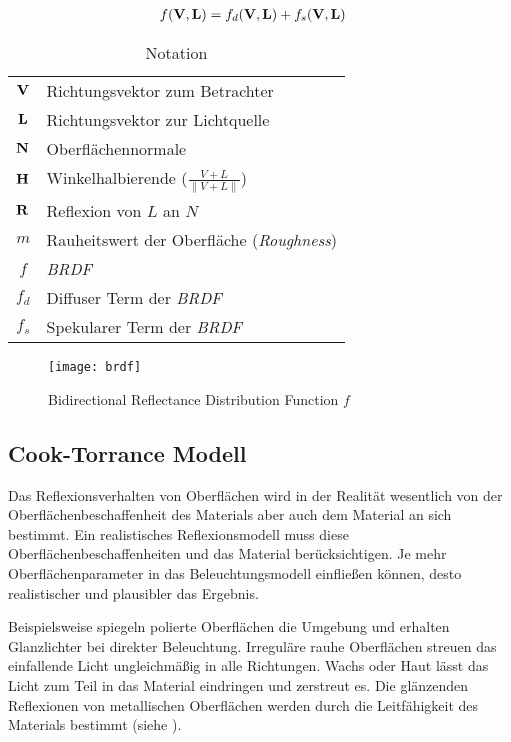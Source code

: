 \begin{align}
	f(\mathbf V,\mathbf L) &= f_d(\mathbf V,\mathbf L) + f_s(\mathbf V,\mathbf L)
	\label{eq:brdf-dekonstruiert}
\end{align}

\begin{table}
\centering
\begin{tabular}{c l}
\hline
	$\mathbf V$ 		& Richtungsvektor zum Betrachter \\
	$\mathbf L$ 		& Richtungsvektor zur Lichtquelle \\
	$\mathbf N$ 		& Oberflächennormale \\
	$\mathbf H$ 		& Winkelhalbierende ($\frac{V + L}{\|V + L\|}$) \\
	$\mathbf R$ 		& Reflexion von $L$ an $N$ \\
	$m$ 	 	& Rauheitswert der Oberfläche (\textit{Roughness}) \\
 	$f$ 		& \textit{BRDF} \\
	$f_d$ 		& Diffuser Term der \textit{BRDF} \\
	$f_s$ 		& Spekularer Term der \textit{BRDF}\\
\hline
\end{tabular}
\caption[Notation \textit{BRDF}]{Notation}
\label{tab:pbr-notation}
\end{table}

\begin{figure}[H]
	\label{fig:brdf}
	\texttt{[image: brdf]}
	\caption[Bidirectional Reflectance Distribution Function]{Bidirectional Reflectance Distribution Function $f$\protect\footnotemark}
\end{figure}

\clearpage

\subsection{Cook-Torrance Modell}

Das Reflexionsverhalten von Oberflächen wird in der Realität wesentlich von der Oberflächenbeschaffenheit des Materials aber auch dem Material an sich bestimmt. Ein realistisches Reflexionsmodell muss diese Oberflächenbeschaffenheiten und das Material berücksichtigen. Je mehr Oberflächenparameter in das Beleuchtungsmodell einfließen können, desto realistischer und plausibler das Ergebnis.

Beispielsweise spiegeln polierte Oberflächen die Umgebung und erhalten Glanzlichter bei direkter Beleuchtung. Irreguläre rauhe Oberflächen streuen das einfallende Licht ungleichmäßig in alle Richtungen. Wachs oder Haut lässt das Licht zum Teil in das Material eindringen und zerstreut es. Die glänzenden Reflexionen von metallischen Oberflächen werden durch die Leitfähigkeit des Materials bestimmt (siehe ).

